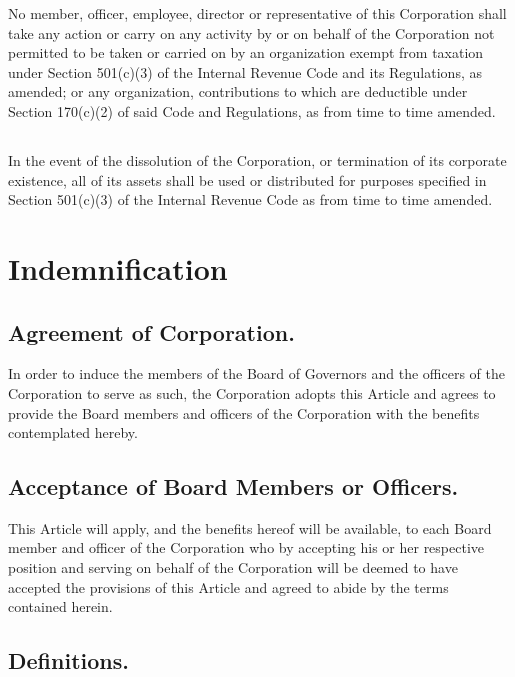 \documentclass[11pt,american,letterpaper,]{constitution}
\begin{document}
No member, officer, employee, director or representative of this Corporation shall take any action or carry on any activity by or on behalf of the Corporation not permitted to be taken or carried on by an organization exempt from taxation under Section 501(c)(3) of the Internal Revenue Code and its Regulations, as amended; or any organization, contributions to which are deductible under Section 170(c)(2) of said Code and Regulations, as from time to time amended.

\subsection[Dissolution]{} 

In the event of the dissolution of the Corporation, or termination of its corporate existence, all of its assets shall be used or distributed for purposes specified in Section 501(c)(3) of the Internal Revenue Code as from time to time amended.

\section{Indemnification}

\subsection{Agreement of Corporation.} 

In order to induce the members of the Board of Governors and the officers of the Corporation to serve as such, the Corporation adopts this Article and agrees to provide the Board members and officers of the Corporation with the benefits contemplated hereby.

\subsection{Acceptance of Board Members or Officers.} 

This Article will apply, and the benefits hereof will be available, to each Board member and officer of the Corporation who by accepting his or her respective position and serving on behalf of the Corporation will be deemed to have accepted the provisions of this Article and agreed to abide by the terms contained herein.

\subsection{Definitions.} 
\end{document}
